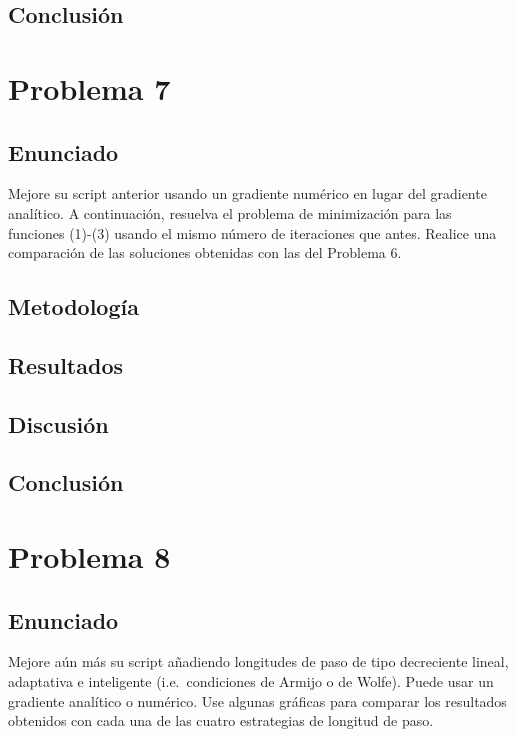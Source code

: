 \documentclass{article}
\begin{document}
\subsection{Conclusión}

\section{Problema 7}

\subsection{Enunciado}
Mejore su script anterior usando un gradiente numérico en lugar del gradiente analítico. A continuación, resuelva el problema de minimización para las funciones (1)-(3) usando el mismo número de iteraciones que antes. Realice una comparación de las soluciones obtenidas con las del Problema 6.


\subsection{Metodología}

\subsection{Resultados}
\setcounter{equation}{0}

\subsection{Discusión}

\subsection{Conclusión}

\section{Problema 8}

\subsection{Enunciado}
Mejore aún más su script añadiendo longitudes de paso de tipo decreciente lineal, adaptativa e inteligente (i.e.\ condiciones de Armijo o de Wolfe). Puede usar un gradiente analítico o numérico. Use algunas gráficas para comparar los resultados obtenidos con cada una de las cuatro estrategias de longitud de paso.
\end{document}
